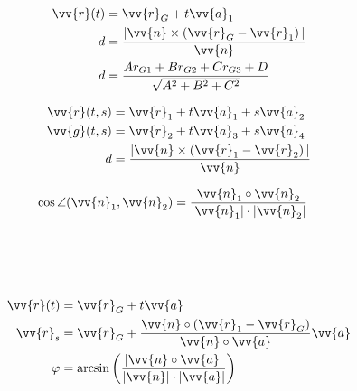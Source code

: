 \begin{boxleft}
\\
\\
\\
\end{boxleft}\begin{boxrightshaded}
\begin{align} 
\vv{r}(t) &=\vv{r}_G+t\vv{a}_1\\
d&=\frac{|\vv{n}\times\left(\vv{r}_G-\vv{r}_1\right)|}{\vv{n}}\\
d&=\frac{Ar_{G1}+Br_{G2}+Cr_{G3}+D}{\sqrt{A^2+B^2+C^2}}
\end{align}\end{boxrightshaded}


\begin{boxleft}
\end{boxleft}\begin{boxrightshaded}
\begin{align} 
\vv{r}(t,s) &=\vv{r}_1+t\vv{a}_1+s\vv{a}_2\\
\vv{g}(t,s) &=\vv{r}_2+t\vv{a}_3+s\vv{a}_4\\
d&=\frac{|\vv{n}\times\left(\vv{r}_1-\vv{r}_2\right)|}{\vv{n}}
\end{align}\end{boxrightshaded}


\begin{boxleft}
\end{boxleft}\begin{boxrightshaded}
\begin{align} 
\cos\angle(\vv{n}_1,\vv{n}_2)&=\frac{\vv{n}_1\circ\vv{n}_2}{|\vv{n}_1|\cdot|\vv{n}_2|}
\end{align}\end{boxrightshaded}

\begin{boxleft}
\\
\\
\\
\end{boxleft}\begin{boxrightshaded}
\begin{align} 
\vv{r}(t) &=\vv{r}_G+t\vv{a}\\
\vv{r}_s&=\vv{r}_G+\frac{\vv{n}\circ\left(\vv{r}_1-\vv{r}_G\right)}{\vv{n}\circ\vv{a}}\vv{a}\\
\varphi&=\arcsin\left(\frac{|\vv{n}\circ\vv{a}|}{|\vv{n}|\cdot|\vv{a}|}\right)
\end{align}\end{boxrightshaded}
